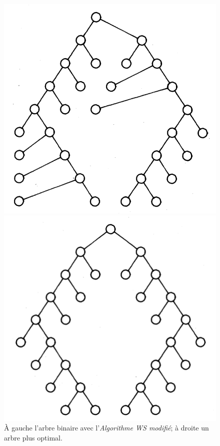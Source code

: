 \documentclass{article}
\begin{document}
  \vfill
  \begin{figure}[h]
      \begin{center}
        \begin{left}
          \includegraphics[scale=0.4]{arbreWSM.png}
        \end{left}
        \begin{right}
          \includegraphics[scale=0.4]{arbreMirror.png}
        \end{right}
      \end{center}
    \caption{À gauche l'arbre binaire avec l'\emph{Algorithme WS modifié}; à droite un arbre plus optimal. \cite{article81}}
    \label{fig:arbresWSMirror}
  \end{figure}
  \vfill
\end{document}
